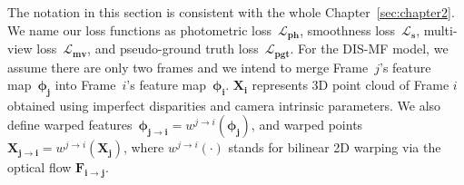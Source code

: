 The notation in this section is consistent with the whole Chapter~\ref{sec:chapter2}. We name our loss functions as photometric loss~$\boldsymbol{\mathcal{L}_{ph}}$, smoothness loss~$\boldsymbol{\mathcal{L}_s}$, multi-view loss~$\boldsymbol{\mathcal{L}_{mv}}$, and pseudo-ground truth loss~$\boldsymbol{\mathcal{L}_{pgt}}$. For the DIS-MF model, we assume there are only two frames and we intend to merge Frame~$j$'s feature map~$\boldsymbol{\phi_j}$ into Frame~$i$'s feature map~$\boldsymbol{\phi_i}$. $\boldsymbol{X_i}$ represents 3D point cloud of Frame $i$ obtained using imperfect disparities and camera intrinsic parameters. We also define warped features~$\boldsymbol{\phi_{j \rightarrow i}}=w^{j \rightarrow i}(\boldsymbol{\phi_j})$, and warped points~$\boldsymbol{X_{j \rightarrow i}}=w^{j \rightarrow i}(\boldsymbol{X_j})$, where $w^{j \rightarrow i}(\cdot)$ stands for bilinear 2D warping via the optical flow $\boldsymbol{F_{i \rightarrow j}}$.

